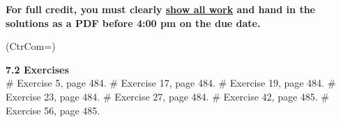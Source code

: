 \documentclass[11pt]{book}
\begin{document}
\thispagestyle{fancy}
\noindent	\textbf{For full credit, you must clearly \underline{show all work} and hand in the solutions as a PDF before 4:00 pm on the due date.}\hfill
\vspace{0.3in}
\begin{easylist}
\ListProperties(CtrCom=\fbox)


\noindent\textbf{7.2 Exercises}\\
\vspace{0.25in}
# Exercise 5, page 484.
\vspace{0.2in}
# Exercise 17, page 484.
\vspace{0.2in}
# Exercise 19, page 484.
\vspace{0.2in}
# Exercise 23, page 484.
\vspace{0.2in}  
# Exercise 27, page 484.
\vspace{0.2in}
# Exercise 42, page 485.
\vspace{0.2in}
# Exercise 56, page 485.

 \end{easylist}
\end{document}

